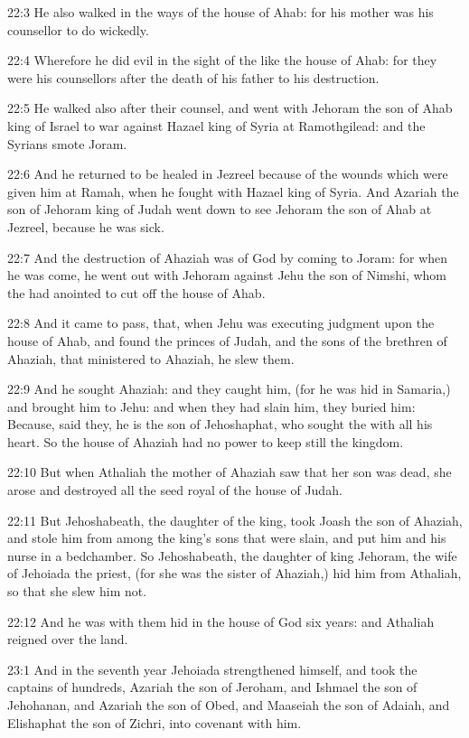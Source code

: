 22:3 He also walked in the ways of the house of Ahab: for his mother
was his counsellor to do wickedly.

22:4 Wherefore he did evil in the sight of the \LORD like the house of
Ahab: for they were his counsellors after the death of his father to
his destruction.

22:5 He walked also after their counsel, and went with Jehoram the son
of Ahab king of Israel to war against Hazael king of Syria at
Ramothgilead: and the Syrians smote Joram.

22:6 And he returned to be healed in Jezreel because of the wounds
which were given him at Ramah, when he fought with Hazael king of
Syria. And Azariah the son of Jehoram king of Judah went down to see
Jehoram the son of Ahab at Jezreel, because he was sick.

22:7 And the destruction of Ahaziah was of God by coming to Joram: for
when he was come, he went out with Jehoram against Jehu the son of
Nimshi, whom the \LORD had anointed to cut off the house of Ahab.

22:8 And it came to pass, that, when Jehu was executing judgment upon
the house of Ahab, and found the princes of Judah, and the sons of the
brethren of Ahaziah, that ministered to Ahaziah, he slew them.

22:9 And he sought Ahaziah: and they caught him, (for he was hid in
Samaria,) and brought him to Jehu: and when they had slain him, they
buried him: Because, said they, he is the son of Jehoshaphat, who
sought the \LORD with all his heart. So the house of Ahaziah had no
power to keep still the kingdom.

22:10 But when Athaliah the mother of Ahaziah saw that her son was
dead, she arose and destroyed all the seed royal of the house of
Judah.

22:11 But Jehoshabeath, the daughter of the king, took Joash the son
of Ahaziah, and stole him from among the king's sons that were slain,
and put him and his nurse in a bedchamber. So Jehoshabeath, the
daughter of king Jehoram, the wife of Jehoiada the priest, (for she
was the sister of Ahaziah,) hid him from Athaliah, so that she slew
him not.

22:12 And he was with them hid in the house of God six years: and
Athaliah reigned over the land.

23:1 And in the seventh year Jehoiada strengthened himself, and took
the captains of hundreds, Azariah the son of Jeroham, and Ishmael the
son of Jehohanan, and Azariah the son of Obed, and Maaseiah the son of
Adaiah, and Elishaphat the son of Zichri, into covenant with him.

